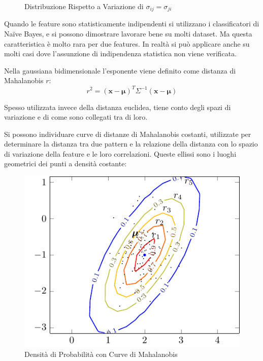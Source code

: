 \documentclass{article}
\numberwithin{equation}{subsection}
\newcommand{\vect}[1]{\boldsymbol{\mathbf{#1}}}
\begin{document}
\begin{figure}[H]
    \caption{Distribuzione Rispetto a Variazione di $\sigma_{ij}=\sigma_{ji}$}%
\end{figure}

Quando le feature sono statisticamente indipendenti si utilizzano i classificatori di Na\"{i}ve Bayes, e si possono dimostrare lavorare bene su molti dataset. Ma questa caratteristica è molto rara per due features. In realtà si può applicare anche su molti casi dove l'assunzione di indipendenza statistica non viene verificata. 

Nella gaussiana bidimensionale l'esponente viene definito come distanza di Mahalanobis $r$:
\begin{equation}
    r^2={(\vect{x}-\vect{\mu})^T\Sigma^{-1}(\vect{x}-\vect{\mu})}
\end{equation}

Spesso utilizzata invece della distanza euclidea, tiene conto degli spazi di variazione e di come sono collegati tra di loro. 

Si possono individuare curve di distanze di Mahalanobis costanti, utilizzate per determinare la distanza tra due pattern e la relazione della distanza con lo spazio di variazione della feature e le loro correlazioni. Queste ellissi sono i luoghi geometrici dei punti a densità costante:

\begin{figure}[H]%
    \centering%
    \includegraphics[scale=0.8]{distanza_mahalanobis.pdf}%
    \caption{Densità di Probabilità con Curve di Mahalanobis}
\end{figure}
\end{document}
